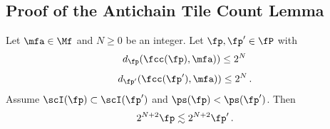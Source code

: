 \subsection{Proof of the Antichain Tile Count Lemma}
\label{subsec-geolem}


\begin{lemma}\label{tile-reach}
\leanok
{}
Let $\mfa\in \Mf$ and $N\ge0$ be an integer.
Let $\fp, \fp'\in \fP$ with
\begin{equation}\label{eqassumedismfa}
    d_{\fp}(\fcc(\fp), \mfa))\le 2^N\,
\end{equation}
\begin{equation}\label{eqassumedismfap}
    d_{\fp'}(\fcc(\fp'), \mfa))\le 2^N\, .
\end{equation}
Assume $\scI(\fp)\subset \scI(\fp')$ and $\ps(\fp)<\ps(\fp')$.
Then
\begin{equation}\label{lp'lp''}2^{N+2}\fp\lesssim 2^{N+2} \fp'\, .
\end{equation}
\end{lemma}


